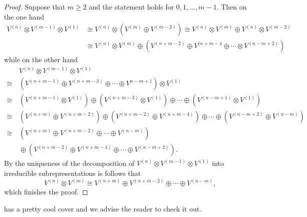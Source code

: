 \begin{proof}
 Suppose that $m \geq 2$ and the statement holds for $0, 1, \dotsc, m-1$. Then on the one hand
 \begin{align*}
  V^{(n)} \otimes V^{(m-1)} \otimes V^{(1)}
  &\cong V^{(n)} \otimes \left( V^{(m)} \oplus V^{(m-2)} \right)
  \cong V^{(n)} \otimes V^{(m)} \oplus V^{(n)} \otimes V^{(m-2)} \\
  &\cong V^{(n)} \otimes V^{(m)} \oplus \left( V^{(n+m-2)} \oplus V^{(n+m-4} \oplus \dotsb \otimes V^{(n-m+2)} \right)
 \end{align*}
 while on the other hand
 \begin{align*}
       &\, V^{(n)} \otimes V^{(m-1)} \otimes V^{(1)} \\
  \cong&\, \left( V^{(n+m-1)} \oplus V^{(n+m-3)} \oplus \dotsb \oplus V^{n-m+1} \right) \otimes V^{(1)} \\
  \cong&\, \left( V^{(n+m-1)} \otimes V^{(1)} \right)
           \oplus \left( V^{(n+m-3)} \otimes V^{(1)} \right)
           \oplus \dotsb
           \oplus \left( V^{(n-m+1)} \otimes V^{(1)} \right) \\
  \cong&\, \left( V^{(n+m)} \oplus V^{(n+m-2)} \right)
           \oplus \left( V^{(n+m-2)} \oplus V^{(n+m-4)} \right)
           \oplus \dotsb
           \oplus \left( V^{(n-m+2)} \oplus V^{(n-m)} \right) \\
  \cong&\, \left( V^{(n+m)} \oplus V^{(n+m-2)} \oplus \dotsb \oplus V^{(n-m)} \right) \\
       &\,  \oplus \left( V^{(n+m-2)} \oplus V^{(n+m-4)} \oplus \dotsb \oplus V^{(n-m+2)} \right).
 \end{align*}
 By the uniqueness of the decomposition of $V^{(n)} \otimes V^{(m-1)} \otimes V^{(1)}$ into irreducible subrepresentations is follows that
 \[
  V^{(n)} \otimes V^{(m)} \cong V^{(n+m)} \oplus V^{(n+m-2)} \oplus \dotsb \oplus V^{(n-m)},
 \]
 which finishes the proof.
\end{proof}


\begin{rem}
 \cite{Lectures_on_sl2_modules} has a pretty cool cover and we advise the reader to check it out.
\end{rem}
























